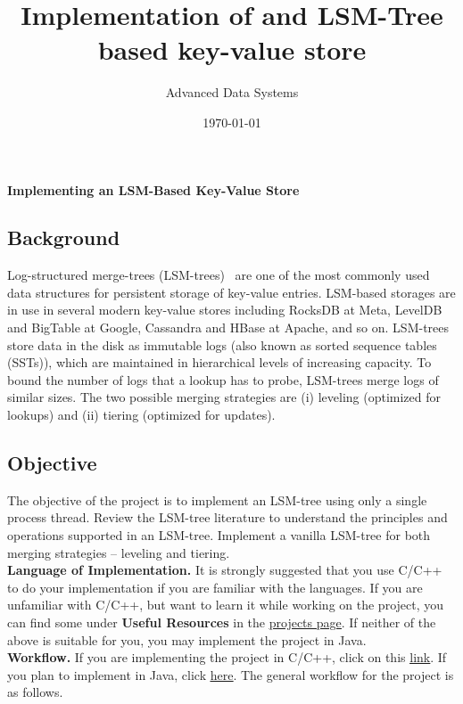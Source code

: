 \documentclass[12pt,a4paper,twoside]{article}
\title{Implementation of and LSM-Tree based key-value store}
\author{Advanced Data Systems}
\date{\today}
\newcommand{\smallspace}{0.2cm}
\begin{document}
\begin{center}
    \Large{\textbf{Implementing an LSM-Based Key-Value Store}}\\
    \vspace{\smallspace}
\end{center}


\normalsize
\subsection*{Background}
Log-structured merge-trees (LSM-trees)~\cite{CLMJLSM2020, NDMASIMONKEY2017, POECDGEJLSM1996} are one of the most commonly used data structures for persistent storage of key-value entries.
LSM-based storages are in use in several modern key-value stores including RocksDB at Meta, LevelDB and BigTable at Google, Cassandra and HBase at Apache, and so on.
LSM-trees store data in the disk as immutable logs (also known as sorted sequence tables (SSTs)), which are maintained in hierarchical levels of increasing capacity.
To bound the number of logs that a lookup has to probe, LSM-trees merge logs of similar sizes.
The two possible merging strategies are (i) leveling (optimized for lookups) and (ii) tiering (optimized for updates).

\subsection*{Objective}
The objective of the project is to implement an LSM-tree using only a single process thread. 
Review the LSM-tree literature to understand the principles and operations supported in an LSM-tree.
Implement a vanilla LSM-tree for both merging strategies -- leveling and tiering. \\

\noindent \textbf{Language of Implementation.} It is strongly suggested that you use C/C++ to do your implementation if you are familiar with the languages. 
If you are unfamiliar with C/C++, but want to learn it while working on the project, you can find some under \textbf{Useful Resources} in the \href{https://ssd-brandeis.github.io/COSI-167A/assignments/}{\underline{projects page}}. 
If neither of the above is suitable for you, you may implement the project in Java. \\ 

\noindent \textbf{Workflow.} If you are implementing the project in C/C++, click on this \href{https://github.com/SSD-Brandeis/LSMTree-DataStore-CPP}{\underline{link}}. 
If you plan to implement in Java, click \href{https://github.com/SSD-Brandeis/LSMTree-DataStore-Java}{\underline{here}}. 
The general workflow for the project is as follows.
\end{document}
